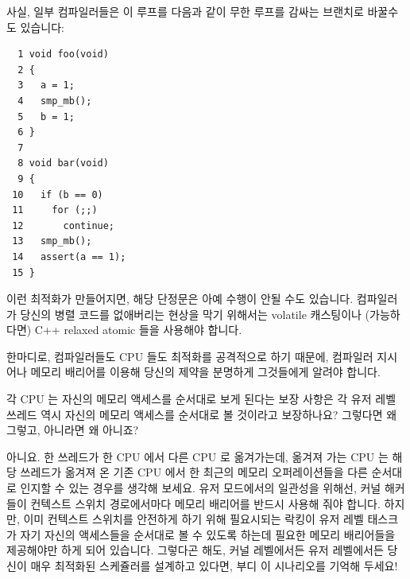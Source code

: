 \begin{enumerate}
	사실, 일부 컴파일러들은 이 루프를 다음과 같이 무한 루프를 감싸는
	브랜치로 바꿀수도 있습니다:

\vspace{5pt}
\begin{minipage}[t]{\columnwidth}
\small
\begin{verbatim}
  1 void foo(void)
  2 {
  3   a = 1;
  4   smp_mb();
  5   b = 1;
  6 }
  7 
  8 void bar(void)
  9 {
 10   if (b == 0)
 11     for (;;)
 12       continue;
 13   smp_mb();
 14   assert(a == 1);
 15 }
\end{verbatim}
\end{minipage}
\vspace{5pt}

	이런 최적화가 만들어지면, 해당 단정문은 아예 수행이 안될 수도 있습니다.
	컴파일러가 당신의 병렬 코드를 없애버리는 현상을 막기 위해서는 volatile
	캐스팅이나 (가능하다면) C++ relaxed atomic 들을 사용해야 합니다.

	한마디로, 컴파일러들도 CPU 들도 최적화를 공격적으로 하기 때문에,
	컴파일러 지시어나 메모리 배리어를 이용해 당신의 제약을 분명하게
	그것들에게 알려야 합니다.

\QuickQ{}
	각 CPU 는 자신의 메모리 액세스를 순서대로 보게 된다는 보장 사항은 각
	유저 레벨 쓰레드 역시 자신의 메모리 액세스를 순서대로 볼 것이라고
	보장하나요?
	그렇다면 왜 그렇고, 아니라면 왜 아니죠?

\QuickA{}
	아니요.
	한 쓰레드가 한 CPU 에서 다른 CPU 로 옮겨가는데, 옮겨져 가는 CPU 는 해당
	쓰레드가 옮겨져 온 기존 CPU 에서 한 최근의 메모리 오퍼레이션들을 다른
	순서대로 인지할 수 있는 경우를 생각해 보세요.
	유저 모드에서의 일관성을 위해선, 커널 해커들이 컨텍스트 스위치
	경로에서마다 메모리 배리어를 반드시 사용해 줘야 합니다.
	하지만, 이미 컨텍스트 스위치를 안전하게 하기 위해 필요시되는 락킹이
	유저 레벨 태스크가 자기 자신의 액세스들을 순서대로 볼 수 있도록 하는데
	필요한 메모리 배리어들을 제공해야만 하게 되어 있습니다.
	그렇다곤 해도, 커널 레벨에서든 유저 레벨에서든 당신이 매우 최적화된
	스케쥴러를 설계하고 있다면, 부디 이 시나리오를 기억해 두세요!
	\iffalse


\end{enumerate}
